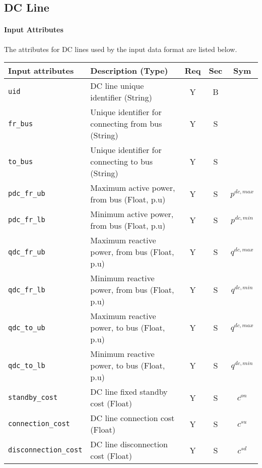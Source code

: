 \documentclass{article}
\begin{document}
     


  
\subsection{DC Line}
\label{nom:dcline}

\paragraph{Input Attributes}
The attributes for DC lines 
used by the input data format are listed below.

\begin{center}
\small
\begin{tabular}{ l | l | c | c | c |}
Input attributes & Description (Type) & Req & Sec & Sym\\
\hline
  {\tt uid} & DC line unique identifier (String)& Y & B &  \\
  {\tt fr\_bus} & Unique identifier for connecting from bus (String) & Y & S & \\
  {\tt to\_bus} & Unique identifier for connecting to bus (String)& Y & S & \\
  {\tt pdc\_fr\_ub} & Maximum active power, from bus (Float, p.u)& Y & S & $p^{dc,max}$\\
  {\tt pdc\_fr\_lb} & Minimum active power, from bus (Float, p.u)& Y & S & $p^{dc,min}$\\
  {\tt qdc\_fr\_ub} & Maximum reactive power, from bus (Float, p.u)& Y & S & $q^{dc,max}$\\
  {\tt qdc\_fr\_lb} & Minimum reactive power, from bus (Float, p.u)& Y & S & $q^{dc,min}$\\
  {\tt qdc\_to\_ub} & Maximum reactive power, to bus (Float, p.u)& Y & S & $q^{dc,max}$\\
  {\tt qdc\_to\_lb} & Minimum reactive power, to bus (Float, p.u)& Y & S & $q^{dc,min}$\\
   {\tt standby\_cost} & {DC line fixed standby cost (Float)} & Y & S & $c^{on}$\\  
  {\tt connection\_cost} & {DC line connection cost (Float)} & Y & S & $c^{su}$\\        
  {\tt disconnection\_cost} & {DC line disconnection cost (Float)} & Y & S & $c^{sd}$\\     
  \hline
\end{tabular}
\end{center}    
\end{document}

